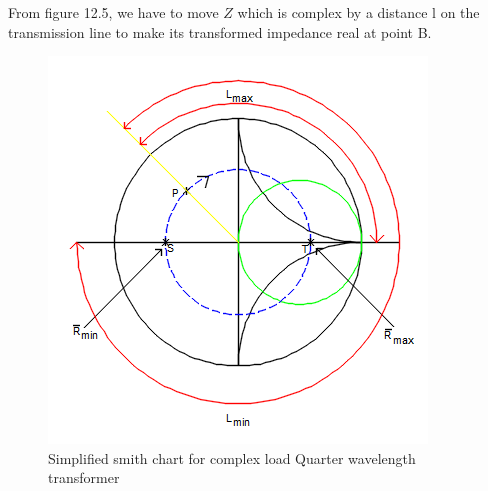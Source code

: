 From figure 12.5, we have to move $ Z$ which is complex by a distance l on the transmission line to make its transformed impedance real at point B.
\begin{figure}[h]
\centering
\includegraphics[scale=0.6]{./graphics/sinsmith}
\caption{ Simplified smith chart for complex load Quarter wavelength transformer }
\end{figure}


